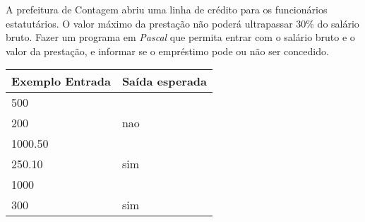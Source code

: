 \item A prefeitura de Contagem abriu uma linha de crédito para os funcionários estatutários. O valor máximo da prestação não poderá ultrapassar 30\% do salário bruto. Fazer um programa em \emph{Pascal} que permita entrar com o salário bruto e o valor da prestação, e informar se o empréstimo pode ou não ser concedido.

\begin{center}
\begin{tabular}{|l|l|} \hline
Exemplo Entrada & Saída esperada \\ \hline
500                &                \\
200                & nao               \\ \hline
1000.50                &                \\
250.10                & sim               \\ \hline
1000                &                \\
300                & sim               \\ \hline
\end{tabular}
\end{center}